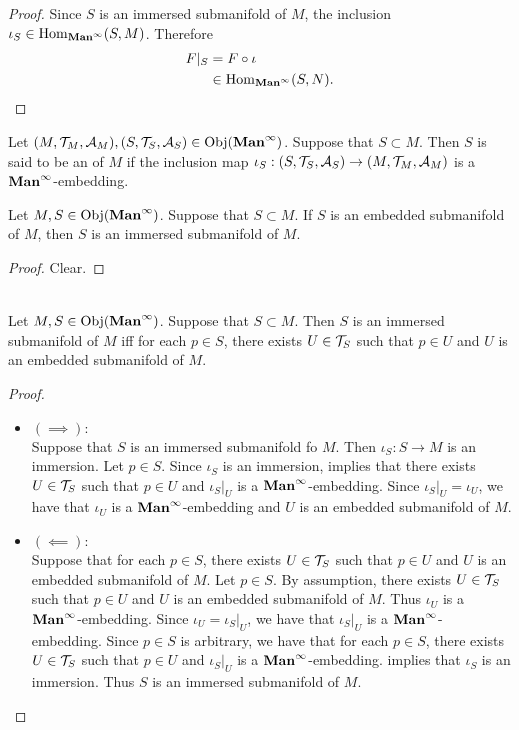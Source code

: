 \documentclass{book}
\begin{document}
\begin{proof} 
	Since $S$ is an immersed submanifold of $M$, the inclusion $\iota_S \in \operatorname{Hom}_{\operatorname*{\text{\textbf{Man}}^{\infty}}}(S, M)$. Therefore
	\begin{align*}
		F|_S
		& = F \circ \iota \\
		& \in \operatorname{Hom}_{\operatorname*{\text{\textbf{Man}}^{\infty}}}(S, N).
	\end{align*}
\end{proof}

	\begin{defn} 
		Let $(M, \mathcal{T}_M, \mathcal{A}_M), (S, \mathcal{T}_S, \mathcal{A}_S) \in \operatorname{Obj}(\operatorname*{\text{\textbf{Man}}^{\infty}})$. Suppose that $S \subset M$. Then $S$ is said to be an  of $M$ if the inclusion map $\iota_S:(S, \mathcal{T}_S, \mathcal{A}_S) \rightarrow (M, \mathcal{T}_M, \mathcal{A}_M)$ is a $\operatorname*{\text{\textbf{Man}}^{\infty}}$-embedding.
	\end{defn}

	\begin{ex} 
		Let $M, S \in \operatorname{Obj}(\operatorname*{\text{\textbf{Man}}^{\infty}})$. Suppose that $S \subset M$. If $S$ is an embedded submanifold of $M$, then $S$ is an immersed submanifold of $M$.
	\end{ex}

	\begin{proof}
		Clear.
	\end{proof}

	\begin{ex}   \\
		Let $M, S \in \operatorname{Obj}(\operatorname*{\text{\textbf{Man}}^{\infty}})$. Suppose that $S \subset M$. Then $S$ is an immersed submanifold of $M$ iff for each $p \in S$, there exists $U \in \mathcal{T}_S$ such that $p \in U$ and $U$ is an embedded submanifold of $M$.
	\end{ex}

	\begin{proof}\
		\begin{itemize}
			\item $(\implies):$ \\
			Suppose that $S$ is an immersed submanifold fo $M$. Then $\iota_S:S \rightarrow M$ is an immersion. Let $p \in S$. Since $\iota_S$ is an immersion,  implies that there exists $U \in \mathcal{T}_S$ such that $p \in U$ and $\iota_S|_U$ is a $\operatorname*{\text{\textbf{Man}}^{\infty}}$-embedding. Since $\iota_S|_U = \iota_U$, we have that $\iota_U$ is a $\operatorname*{\text{\textbf{Man}}^{\infty}}$-embedding and $U$ is an embedded submanifold of $M$.
			\item $(\impliedby):$ \\
			Suppose that for each $p \in S$, there exists $U \in \mathcal{T}_S$ such that $p \in U$ and $U$ is an embedded submanifold of $M$. Let $p \in S$. By assumption, there exists  $U \in \mathcal{T}_S$ such that $p \in U$ and $U$ is an embedded submanifold of $M$. Thus $\iota_U$ is a $\operatorname*{\text{\textbf{Man}}^{\infty}}$-embedding. Since $\iota_U = \iota_S|_U$, we have that $\iota_S|_U$ is a $\operatorname*{\text{\textbf{Man}}^{\infty}}$-embedding. Since $p \in S$ is arbitrary, we have that for each $p \in S$, there exists $U \in \mathcal{T}_S$ such that $p \in U$ and $\iota_S|_U$ is a $\operatorname*{\text{\textbf{Man}}^{\infty}}$-embedding.  implies that $\iota_S$ is an immersion. Thus $S$ is an immersed submanifold of $M$.
		\end{itemize}
	\end{proof}
\end{document}
